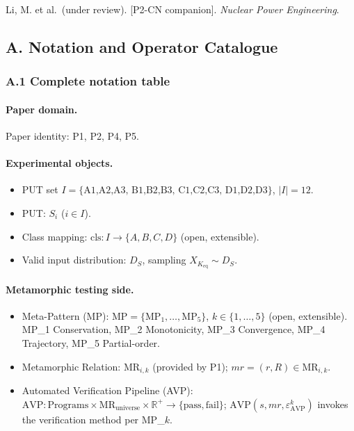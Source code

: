 \documentclass[review,12pt,authoryear]{elsarticle}
\begin{document}
Li, M. et al.~(under review). {[}P2-CN companion{]}. \emph{Nuclear Power
Engineering}.

\clearpage
\appendix

\subsection{A. Notation and Operator Catalogue}\label{a.-notation-and-operator-catalogue}

\subsubsection{A.1 Complete notation table}\label{a.1-complete-notation-table}

\paragraph{Paper domain.} Paper identity: P1, P2, P4, P5.

\paragraph{Experimental objects.}
\begin{itemize}
\item PUT set $I = \{\text{A1,A2,A3, B1,B2,B3, C1,C2,C3, D1,D2,D3}\}$, $|I| = 12$.
\item PUT: $S_i$ ($i \in I$).
\item Class mapping: $\mathrm{cls} : I \to \{A, B, C, D\}$ (open, extensible).
\item Valid input distribution: $D_S$, sampling $X_{K_{\mathrm{eq}}} \sim D_S$.
\end{itemize}

\paragraph{Metamorphic testing side.}
\begin{itemize}
\item Meta-Pattern (MP): $\mathrm{MP} = \{\mathrm{MP}_1, \ldots, \mathrm{MP}_5\}$, $k \in \{1,\ldots,5\}$ (open, extensible). MP\_1 Conservation, MP\_2 Monotonicity, MP\_3 Convergence, MP\_4 Trajectory, MP\_5 Partial-order.
\item Metamorphic Relation: $\mathrm{MR}_{i,k}$ (provided by P1); $\mathit{mr} = (r, R) \in \mathrm{MR}_{i,k}$.
\item Automated Verification Pipeline (AVP): $\mathrm{AVP} : \text{Programs} \times \mathrm{MR}_{\text{universe}} \times \mathbb{R}^+ \to \{\text{pass}, \text{fail}\}$; $\mathrm{AVP}(s, \mathit{mr}, \varepsilon_{\mathrm{AVP}}^k)$ invokes the verification method per MP\_$k$.
\end{itemize}
\end{document}

